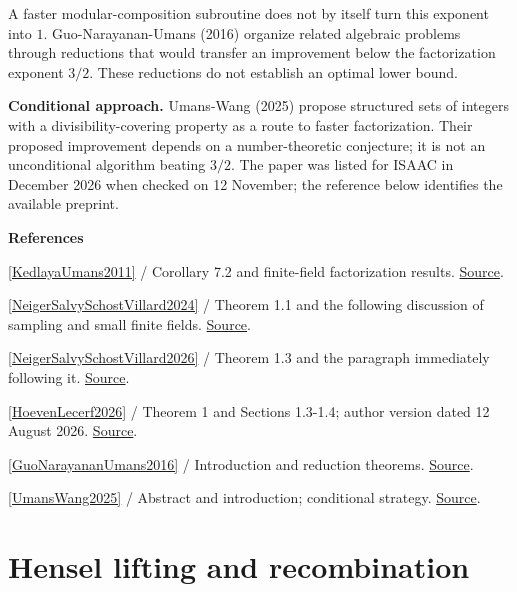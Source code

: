 \documentclass[11pt,a4paper,oneside,openany]{book}
\newcommand{\atlasdisplay}[1]{\par\begingroup\centering\vspace{3pt}\noindent\adjustbox{max width=\linewidth}{\(\displaystyle #1\)}\par\vspace{5pt}\endgroup}
\newenvironment{sources}{\par\smallskip\begingroup\footnotesize\color{atlasgray}\leftskip=10pt\setlength{\parskip}{2pt}}{\par\endgroup\smallskip}
\begin{document}
\atlasdisplay{O\!\left(n^{3/2+o(1)}\log^{1+o(1)}q+n^{1+o(1)}\log^{2+o(1)}q\right).}
\color{black} A faster modular-composition subroutine does not by itself turn this exponent into \(1\). Guo-Narayanan-Umans (2016) organize related algebraic problems through reductions that would transfer an improvement below the factorization exponent \(3/2\). These reductions do not establish an optimal lower bound.\par
\color{black} \textbf{Conditional approach.} Umans-Wang (2025) propose structured sets of integers with a divisibility-covering property as a route to faster factorization. Their proposed improvement depends on a number-theoretic conjecture; it is not an unconditional algorithm beating \(3/2\). The paper was listed for ISAAC in December 2026 when checked on 12 November; the reference below identifies the available preprint.\par
\begin{sources}
\textbf{References}\par\smallskip
\noindent\hyperlink{ref:KedlayaUmans2011}{[KedlayaUmans2011]} / Corollary 7.2 and finite-field factorization results.  \href{https://doi.org/10.1137/08073408X}{Source}.\par
\noindent\hyperlink{ref:NeigerSalvySchostVillard2024}{[NeigerSalvySchostVillard2024]} / Theorem 1.1 and the following discussion of sampling and small finite fields.  \href{https://doi.org/10.1145/3638349}{Source}.\par
\noindent\hyperlink{ref:NeigerSalvySchostVillard2026}{[NeigerSalvySchostVillard2026]} / Theorem 1.3 and the paragraph immediately following it.  \href{https://doi.org/10.1145/3815436.3815451}{Source}.\par
\noindent\hyperlink{ref:HoevenLecerf2026}{[HoevenLecerf2026]} / Theorem 1 and Sections 1.3-1.4; author version dated 12 August 2026.  \href{https://doi.org/10.1016/j.jco.2026.102073}{Source}.\par
\noindent\hyperlink{ref:GuoNarayananUmans2016}{[GuoNarayananUmans2016]} / Introduction and reduction theorems.  \href{https://doi.org/10.4230/LIPIcs.MFCS.2016.47}{Source}.\par
\noindent\hyperlink{ref:UmansWang2025}{[UmansWang2025]} / Abstract and introduction; conditional strategy.  \href{https://arxiv.org/abs/2511.10851}{Source}.\par
\end{sources}\color{black}
\section{Hensel lifting and recombination}
\end{document}
